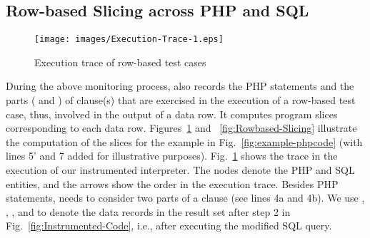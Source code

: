 \subsection{Row-based Slicing across PHP and SQL}

\begin{figure}[tbp]
  \centering
  \texttt{[image: images/Execution-Trace-1.eps]}\\
  \caption{Execution trace of row-based test cases}\label{fig:Execution-Trace}
\end{figure}



During the above monitoring process, {\tool} also records the PHP
statements and the parts ( and ) of
 clause(s) that are exercised in the execution of a
row-based test case, thus, involved in the output of a data row. It
computes program slices corresponding to each data row.
Figures~\ref{fig:Execution-Trace} and ~\ref{fig:Rowbased-Slicing}
illustrate the computation of the slices for the example in
Fig.~\ref{fig:example-phpcode} (with lines 5' and 7 added for
illustrative purposes). Fig.~\ref{fig:Execution-Trace} shows the
trace in the execution of our instrumented interpreter. The
nodes denote the PHP and SQL entities, and the arrows show the order
in the execution trace. Besides PHP statements, {\tool} needs to
consider two parts of a  clause (see lines 4a and 4b).
We use , , , and
 to denote the data records in the result set 
after step 2 in Fig.~\ref{fig:Instrumented-Code}, i.e., after
executing the modified SQL query.

